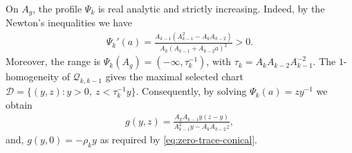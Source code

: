 \documentclass{amsart}
\theoremstyle{plain}
\theoremstyle{mainintrothm}
\theoremstyle{definition}
\begin{document}
	\medskip

	On $A_g$, the profile $\Psi_k$ is real analytic and strictly increasing.  Indeed, by the Newton's inequalities we have
	\begin{align*}
		\Psi_k'(a)=\frac{A_{k-1}(A_{k-1}^2-A_kA_{k-2})}
		{A_k(A_{k-1}+A_{k-2}a)^2}>0.
	\end{align*}
 Moreover, the range is $\Psi_k(A_g)=(-\infty,\tau_k^{-1})$,  with $\tau_k=A_kA_{k-2}A_{k-1}^{-2}$. The $1$-homogeneity of $\mathcal Q_{k,k-1}$ gives the maximal selected chart $\mathcal D=\{(y,z):y>0,\ z<\tau_k^{-1}y\}$. Consequently, by solving $\Psi_k(a)=zy^{-1}$ we obtain
	\begin{align*}
		g(y,z)
		=
		\frac{A_kA_{k-1}y(z-y)}
		{A_{k-1}^2y-A_kA_{k-2}z},
	\end{align*}
and, $g(y,0)=-\rho_ky$ as required by \eqref{eq:zero-trace-conical}.  

	\medskip
\end{document}
